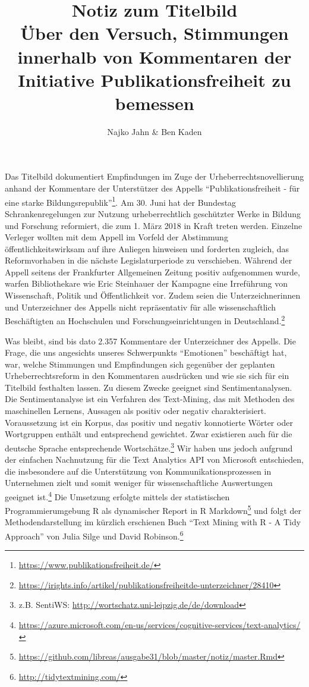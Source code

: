 \documentclass[a4paper,
fontsize=11pt,
oneside,
numbers=noperiodatend,
parskip=half-,
bibliography=totoc,
final
]{scrartcl}
\title{\LARGE{Notiz zum Titelbild\\Über den Versuch, Stimmungen innerhalb von Kommentaren der Initiative Publikationsfreiheit zu bemessen}} %
\author{Najko Jahn \& Ben Kaden} %
\date{}
\begin{document}
\maketitle
\thispagestyle{fancyplain} 


Das Titelbild dokumentiert Empfindungen im Zuge der
Urheberrechtsnovellierung anhand der Kommentare der Unterstützer des
Appells \enquote{Publikationsfreiheit - für eine starke
Bildungsrepublik}\footnote{\url{https://www.publikationsfreiheit.de/}}.
Am 30. Juni hat der Bundestag Schrankenregelungen zur Nutzung
urheberrechtlich geschützter Werke in Bildung und Forschung reformiert,
die zum 1. März 2018 in Kraft treten werden. Einzelne Verleger wollten
mit dem Appell im Vorfeld der Abstimmung öffentlichkeitswirksam auf ihre
Anliegen hinweisen und forderten zugleich, das Reformvorhaben in die
nächste Legislaturperiode zu verschieben. Während der Appell seitens der
Frankfurter Allgemeinen Zeitung positiv aufgenommen wurde, warfen
Bibliothekare wie Eric Steinhauer der Kampagne eine Irreführung von
Wissenschaft, Politik und Öffentlichkeit vor. Zudem seien die
Unterzeichnerinnen und Unterzeichner des Appells nicht repräsentativ für
alle wissenschaftlich Beschäftigten an Hochschulen und
Forschungseinrichtungen in Deutschland.\footnote{\url{https://irights.info/artikel/publikationsfreiheitde-unterzeichner/28410}}

Was bleibt, sind bis dato 2.357 Kommentare der Unterzeichner des
Appells. Die Frage, die uns angesichts unseres Schwerpunkts
\enquote{Emotionen} beschäftigt hat, war, welche Stimmungen und
Empfindungen sich gegenüber der geplanten Urheberrechtsreform in den
Kommentaren ausdrücken und wie sie sich für ein Titelbild festhalten
lassen. Zu diesem Zwecke geeignet sind Sentimentanalysen. Die
Sentimentanalyse ist ein Verfahren des Text-Mining, das mit Methoden des
maschinellen Lernens, Aussagen als positiv oder negativ charakterisiert.
Voraussetzung ist ein Korpus, das positiv und negativ konnotierte Wörter
oder Wortgruppen enthält und entsprechend gewichtet. Zwar existieren
auch für die deutsche Sprache entsprechende Wortschätze.\footnote{z.B.
  SentiWS: \url{http://wortschatz.uni-leipzig.de/de/download}} Wir haben
uns jedoch aufgrund der einfachen Nachnutzung für die Text Analytics API
von Microsoft entschieden, die insbesondere auf die Unterstützung von
Kommunikationsprozessen in Unternehmen zielt und somit weniger für
wissenschaftliche Auswertungen geeignet ist.\footnote{\url{https://azure.microsoft.com/en-us/services/cognitive-services/text-analytics/}}
Die Umsetzung erfolgte mittels der statistischen Programmierumgebung R
als dynamischer Report in R Markdown\footnote{\url{https://github.com/libreas/ausgabe31/blob/master/notiz/master.Rmd}}
und folgt der Methodendarstellung im kürzlich erschienen Buch
\enquote{Text Mining with R - A Tidy Approach} von Julia Silge und David
Robinson.\footnote{\url{http://tidytextmining.com/}}
\end{document}
